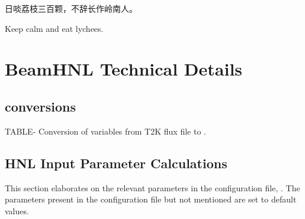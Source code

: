 \begin{savequote}[8cm]
\begin{CJK*}{UTF8}{gbsn}
  日啖荔枝三百颗，不辞长作岭南人。
\end{CJK*}

Keep calm and eat lychees.

\end{savequote}

\chapter{\label{app:hnl}BeamHNL Technical Details}

\minitoc

\section{ conversions}
\label{sec:app-hnl-dk2nu}

    TABLE- Conversion of variables from T2K flux file to .

\section{HNL Input Parameter Calculations}
\label{sec:app-hnl-input}
    This section elaborates on the relevant parameters in the \genie {} configuration file, . 
    The parameters present in the configuration file but not mentioned are set to default values.
    
